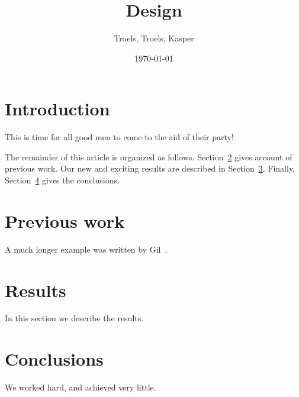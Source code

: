 \documentclass[12pt]{article}
\author{
        Troels, Troels, Kasper
}
\date{\today}
\title{Design}
\begin{document}
\maketitle

\section{Introduction}
This is time for all good men to come to the aid of their party!


The remainder of this article is organized as follows.
Section~\ref{previous work} gives account of previous work.  Our new
and exciting results are described in Section~\ref{results}.  Finally,
Section~\ref{conclusions} gives the conclusions.

\section{Previous work}\label{previous work}
A much longer \LaTeXe{} example was written by Gil~\cite{Gil:02}.

\section{Results}\label{results}
In this section we describe the results.

\section{Conclusions}\label{conclusions}
We worked hard, and achieved very little.



\end{document}
